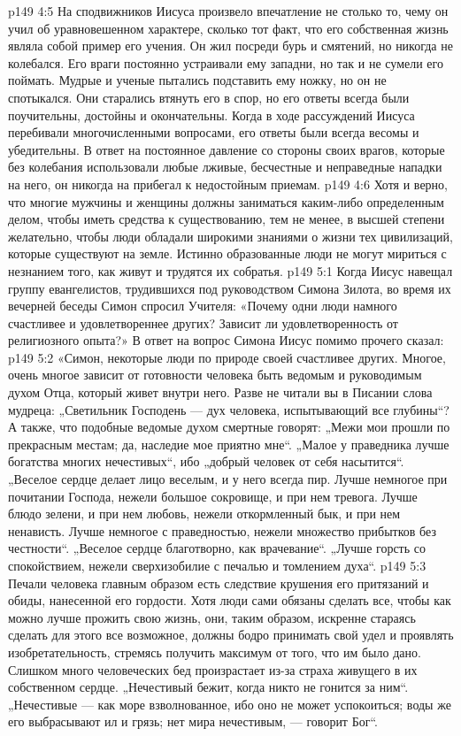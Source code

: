 \vs p149 4:5 На сподвижников Иисуса произвело впечатление не столько то, чему он учил об уравновешенном характере, сколько тот факт, что его собственная жизнь являла собой пример его учения. Он жил посреди бурь и смятений, но никогда не колебался. Его враги постоянно устраивали ему западни, но так и не сумели его поймать. Мудрые и ученые пытались подставить ему ножку, но он не спотыкался. Они старались втянуть его в спор, но его ответы всегда были поучительны, достойны и окончательны. Когда в ходе рассуждений Иисуса перебивали многочисленными вопросами, его ответы были всегда весомы и убедительны. В ответ на постоянное давление со стороны своих врагов, которые без колебания использовали любые лживые, бесчестные и неправедные нападки на него, он никогда на прибегал к недостойным приемам.
\vs p149 4:6 Хотя и верно, что многие мужчины и женщины должны заниматься каким\hyp{}либо определенным делом, чтобы иметь средства к существованию, тем не менее, в высшей степени желательно, чтобы люди обладали широкими знаниями о жизни тех цивилизаций, которые существуют на земле. Истинно образованные люди не могут мириться с незнанием того, как живут и трудятся их собратья.
\vs p149 5:1 Когда Иисус навещал группу евангелистов, трудившихся под руководством Симона Зилота, во время их вечерней беседы Симон спросил Учителя: «Почему одни люди намного счастливее и удовлетвореннее других? Зависит ли удовлетворенность от религиозного опыта?» В ответ на вопрос Симона Иисус помимо прочего сказал:
\vs p149 5:2 \pc «Симон, некоторые люди по природе своей счастливее других. Многое, очень многое зависит от готовности человека быть ведомым и руководимым духом Отца, который живет внутри него. Разве не читали вы в Писании слова мудреца: „Светильник Господень --- дух человека, испытывающий все глубины“? А также, что подобные ведомые духом смертные говорят: „Межи мои прошли по прекрасным местам; да, наследие мое приятно мне“. „Малое у праведника лучше богатства многих нечестивых“, ибо „добрый человек от себя насытится“. „Веселое сердце делает лицо веселым, и у него всегда пир. Лучше немногое при почитании Господа, нежели большое сокровище, и при нем тревога. Лучше блюдо зелени, и при нем любовь, нежели откормленный бык, и при нем ненависть. Лучше немногое с праведностью, нежели множество прибытков без честности“. „Веселое сердце благотворно, как врачевание“. „Лучше горсть со спокойствием, нежели сверхизобилие с печалью и томлением духа“.
\vs p149 5:3 Печали человека главным образом есть следствие крушения его притязаний и обиды, нанесенной его гордости. Хотя люди сами обязаны сделать все, чтобы как можно лучше прожить свою жизнь, они, таким образом, искренне стараясь сделать для этого все возможное, должны бодро принимать свой удел и проявлять изобретательность, стремясь получить максимум от того, что им было дано. Слишком много человеческих бед произрастает из\hyp{}за страха живущего в их собственном сердце. „Нечестивый бежит, когда никто не гонится за ним“. „Нечестивые --- как море взволнованное, ибо оно не может успокоиться; воды же его выбрасывают ил и грязь; нет мира нечестивым, --- говорит Бог“.
